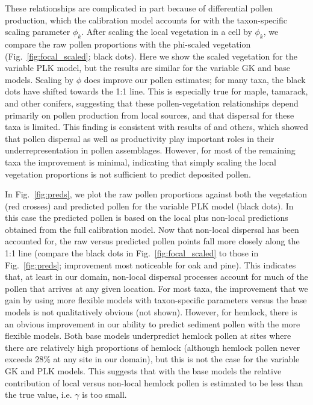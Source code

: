 \documentclass[12pt]{article}
\begin{document}
These relationships are complicated in part because of differential
pollen production, which the calibration model accounts for with the
taxon-specific scaling parameter $\phi_k$. After scaling the local
vegetation in a cell by $\phi_k$, we compare the raw pollen
proportions with the phi-scaled vegetation
(Fig.~\ref{fig:focal_scaled}; black dots). Here we show the scaled
vegetation for the variable PLK model, but the results are similar for
the variable GK and base models. Scaling by $\phi$ does improve our
pollen estimates; for many taxa, the black dots have shifted towards
the 1:1 line. This is especially true for maple, tamarack, and other
conifers, suggesting that these pollen-vegetation relationships depend
primarily on pollen production from local sources, and that dispersal
for these taxa is limited. This finding is consistent with results of
\citet{jackson1990, jackson1991pollen} and others, which showed that
pollen dispersal as well as productivity play important roles in their
underrepresentation in pollen assemblages. However, for most of the
remaining taxa the improvement is minimal, indicating that simply
scaling the local vegetation proportions is not sufficient to predict
deposited pollen.

In Fig.~\ref{fig:preds}, we plot the raw pollen proportions against
both the vegetation (red crosses) and predicted pollen for the
variable PLK model (black dots). In this case the predicted pollen is
based on the local plus non-local predictions obtained from the full
calibration model. Now that non-local dispersal has been accounted
for, the raw versus predicted pollen points fall more closely along
the 1:1 line (compare the black dots in Fig.~\ref{fig:focal_scaled} to
those in Fig.~\ref{fig:preds}; improvement most noticeable for oak and
pine). This indicates that, at least in our domain, non-local
dispersal processes account for much of the pollen that arrives at any
given location. For most taxa, the improvement that we gain by using
more flexible models with taxon-specific parameters versus the base
models is not qualitatively obvious (not shown). However, for hemlock,
there is an obvious improvement in our ability to predict sediment
pollen with the more flexible models. Both base models underpredict
hemlock pollen at sites where there are relatively high proportions of
hemlock (although hemlock pollen never exceeds 28\% at any site in our
domain), but this is not the case for the variable GK and PLK
models. This suggests that with the base models the relative
contribution of local versus non-local hemlock pollen is estimated to
be less than the true value, i.e. $\gamma$ is too small.
\end{document}
